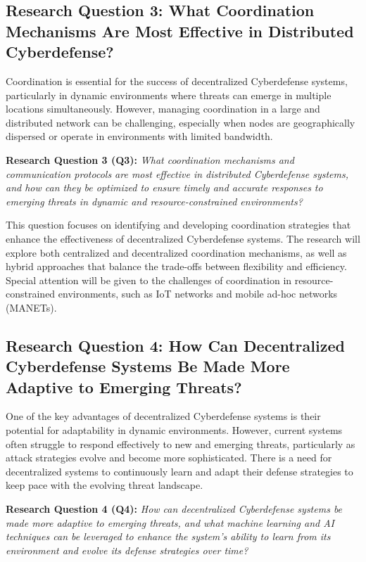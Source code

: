 \subsection{Research Question 3: What Coordination Mechanisms Are Most Effective in Distributed Cyberdefense?}

Coordination is essential for the success of decentralized Cyberdefense systems, particularly in dynamic environments where threats can emerge in multiple locations simultaneously. However, managing coordination in a large and distributed network can be challenging, especially when nodes are geographically dispersed or operate in environments with limited bandwidth.

\textbf{Research Question 3 (Q3):} \textit{What coordination mechanisms and communication protocols are most effective in distributed Cyberdefense systems, and how can they be optimized to ensure timely and accurate responses to emerging threats in dynamic and resource-constrained environments?}

This question focuses on identifying and developing coordination strategies that enhance the effectiveness of decentralized Cyberdefense systems. The research will explore both centralized and decentralized coordination mechanisms, as well as hybrid approaches that balance the trade-offs between flexibility and efficiency. Special attention will be given to the challenges of coordination in resource-constrained environments, such as IoT networks and mobile ad-hoc networks (MANETs).

\subsection{Research Question 4: How Can Decentralized Cyberdefense Systems Be Made More Adaptive to Emerging Threats?}

One of the key advantages of decentralized Cyberdefense systems is their potential for adaptability in dynamic environments. However, current systems often struggle to respond effectively to new and emerging threats, particularly as attack strategies evolve and become more sophisticated. There is a need for decentralized systems to continuously learn and adapt their defense strategies to keep pace with the evolving threat landscape.

\textbf{Research Question 4 (Q4):} \textit{How can decentralized Cyberdefense systems be made more adaptive to emerging threats, and what machine learning and AI techniques can be leveraged to enhance the system's ability to learn from its environment and evolve its defense strategies over time?}


